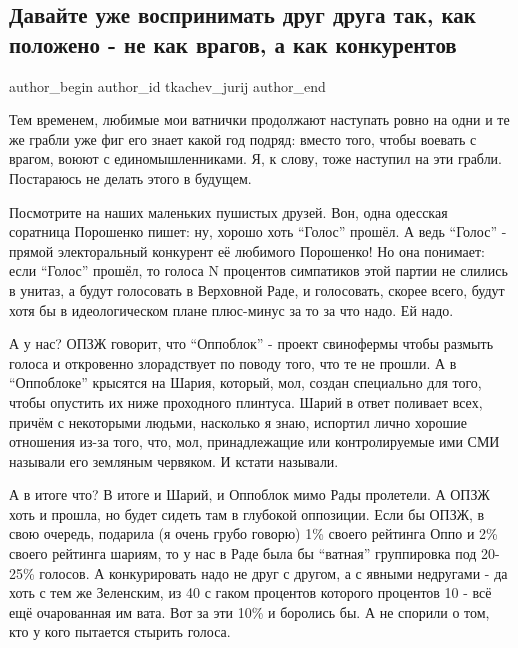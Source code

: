  
 
 
 
 
\subsection{Давайте уже воспринимать друг друга так, как положено - не как врагов, а как конкурентов}
\label{sec:22_07_2019.tg.tkachev_jurij.1.vatnichki}

\ifcmt
 author_begin
   author_id tkachev_jurij
 author_end
\fi

Тем временем, любимые мои ватнички продолжают наступать ровно на одни и те же
грабли уже фиг его знает какой год подряд: вместо того, чтобы воевать с врагом,
воюют с единомышленниками. Я, к слову, тоже наступил на эти грабли. Постараюсь
не делать этого в будущем. 

Посмотрите на наших маленьких пушистых друзей. Вон, одна одесская соратница
Порошенко пишет: ну, хорошо хоть \enquote{Голос} прошёл. А ведь \enquote{Голос} - прямой
электоральный конкурент её любимого Порошенко! Но она понимает: если \enquote{Голос}
прошёл, то голоса N процентов симпатиков этой партии не слились в унитаз, а
будут голосовать в Верховной Раде, и голосовать, скорее всего, будут хотя бы в
идеологическом плане плюс-минус за то за что надо. Ей надо.

А у нас? ОПЗЖ говорит, что \enquote{Оппоблок} - проект свинофермы чтобы размыть голоса
и откровенно злорадствует по поводу того, что те не прошли. А в \enquote{Оппоблоке}
крысятся на Шария, который, мол, создан специально для того, чтобы опустить их
ниже проходного плинтуса. Шарий в ответ поливает всех, причём с некоторыми
людьми, насколько я знаю, испортил лично хорошие отношения из-за того, что,
мол, принадлежащие или контролируемые ими СМИ называли его земляным червяком. И
кстати называли.

А в итоге что? В итоге и Шарий, и Оппоблок мимо Рады пролетели. А ОПЗЖ хоть и
прошла, но будет сидеть там в глубокой оппозиции. Если бы ОПЗЖ, в свою очередь,
подарила (я очень грубо говорю) 1\% своего рейтинга Оппо и 2\% своего рейтинга
шариям, то у нас в Раде была бы \enquote{ватная} группировка под 20-25\% голосов. А
конкурировать надо не друг с другом, а с явными недругами - да хоть с тем же
Зеленским, из 40 с гаком процентов которого процентов 10 - всё ещё очарованная
им вата. Вот за эти 10\% и боролись бы. А не спорили о том, кто у кого пытается
стырить голоса.

